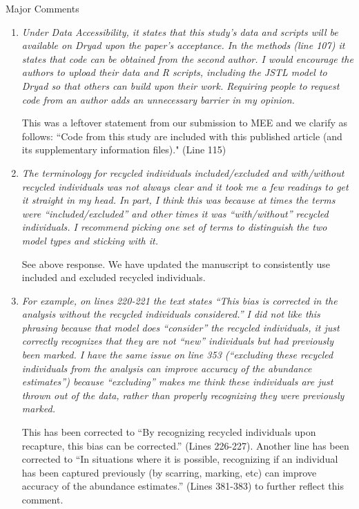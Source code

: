 \documentclass[12pt]{article}
\begin{document}
\noindent Major Comments
\begin{enumerate}
\item  {\it Under Data Accessibility, it states that this study’s data and scripts will be available on Dryad upon the paper’s acceptance. In the methods (line 107) it states that code can be obtained from the second author. I would encourage the authors to upload their data and R scripts, including the JSTL model to Dryad so that others can build upon their work. Requiring people to request code from an author adds an unnecessary barrier in my opinion.}

This was a leftover statement from our submission to MEE and we clarify as follows:
``Code from this study are included with this published article (and its supplementary information files)." (Line 115)

\item  {\it The terminology for recycled individuals included/excluded and with/without recycled individuals was not always clear and it took me a few readings to get it straight in my head. In part, I think this was because at times the terms were “included/excluded” and other times it was “with/without” recycled individuals. I recommend picking one set of terms to distinguish the two model types and sticking with it.}

See above response. We have updated the manuscript to consistently use included and excluded recycled individuals. 

\item {\it For example, on lines 220-221 the text states “This bias is corrected in the analysis without the recycled individuals considered.” I did not like this phrasing because that model does “consider” the recycled individuals, it just correctly recognizes that they are not “new” individuals but had previously been marked. I have the same issue on line 353 (“excluding these recycled individuals from the analysis can improve accuracy of the abundance estimates”) because “excluding” makes me think these individuals are just thrown out of the data, rather than properly recognizing they were previously marked.}

This has been corrected to ``By recognizing recycled individuals upon recapture, this bias can be corrected.'' (Lines 226-227).  Another line has been corrected to ``In situations where it is possible, recognizing if an individual has been
captured previously (by scarring, marking, etc) can improve accuracy of the
abundance estimates.'' (Lines 381-383) to further reflect this comment. 


\end{enumerate}
\end{document}
